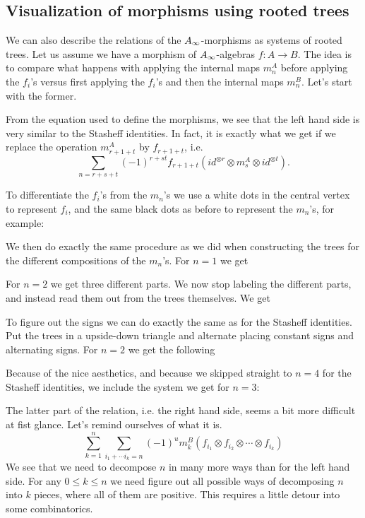 


\subsection{Visualization of morphisms using rooted trees}

We can also describe the relations of the $A_{\infty}$-morphisms as systems of rooted trees. Let us assume we have a morphism of $A_{\infty}$-algebras $f\colon A\longrightarrow B$. The idea is to compare what happens with applying the internal maps $m_n^A$ before applying the $f_i$'s versus first applying the $f_i$'s and then the internal maps $m_n^B$. Let's start with the former.

From the equation used to define the morphisms, we see that the left hand side is very similar to the Stasheff identities. In fact, it is exactly what we get if we replace the operation $m_{r+1+t}^A$ by $f_{r+1+t}$, i.e. 
\begin{equation*}
    \sum_{n = r+s+t}(-1)^{r+st}f_{r+1+t}(id^{\otimes r}\otimes m_s^A \otimes id^{\otimes t}).
\end{equation*}

To differentiate the $f_i$'s from the $m_n$'s we use a white dots in the central vertex to represent $f_i$, and the same black dots as before to represent the $m_n$'s, for example:


We then do exactly the same procedure as we did when constructing the trees for the different compositions of the $m_n$'s. For $n=1$ we get 


For $n=2$ we get three different parts. We now stop labeling the different parts, and instead read them out from the trees themselves. We get


To figure out the signs we can do exactly the same as for the Stasheff identities. Put the trees in a upside-down triangle and alternate placing constant signs and alternating signs. For $n=2$ we get the following


Because of the nice aesthetics, and because we skipped straight to $n=4$ for the Stasheff identities, we include the system we get for $n=3$:



The latter part of the relation, i.e. the right hand side, seems a bit more difficult at fist glance. Let's remind ourselves of what it is.
\begin{equation*}
     \sum_{k=1}^{n}\sum_{i_1+\cdots i_k = n}(-1)^{u} m_k^B(f_{i_1}\otimes f_{i_2}\otimes \cdots \otimes f_{i_k})
\end{equation*}
We see that we need to decompose $n$ in many more ways than for the left hand side. For any $0\leq k\leq n$ we need figure out all possible ways of decomposing $n$ into $k$ pieces, where all of them are positive. This requires a little detour into some combinatorics.

